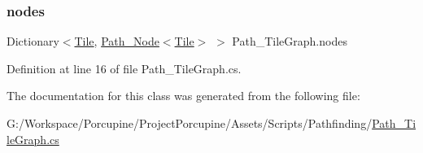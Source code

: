 \subsubsection{\texorpdfstring{nodes}{nodes}}
{\footnotesize\ttfamily Dictionary$<$\hyperlink{class_tile}{Tile}, \hyperlink{class_path___node}{Path\+\_\+\+Node}$<$\hyperlink{class_tile}{Tile}$>$ $>$ Path\+\_\+\+Tile\+Graph.\+nodes}



Definition at line 16 of file Path\+\_\+\+Tile\+Graph.\+cs.



The documentation for this class was generated from the following file\+:\begin{DoxyCompactItemize}
\item 
G\+:/\+Workspace/\+Porcupine/\+Project\+Porcupine/\+Assets/\+Scripts/\+Pathfinding/\hyperlink{_path___tile_graph_8cs}{Path\+\_\+\+Tile\+Graph.\+cs}\end{DoxyCompactItemize}
